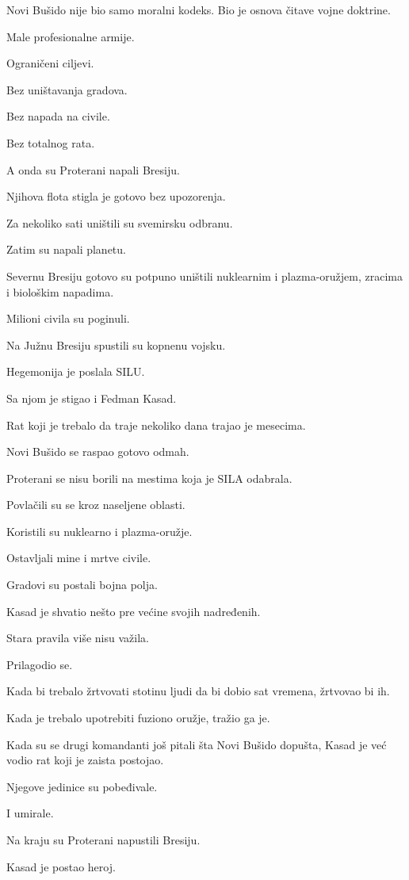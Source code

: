 Novi Bušido nije bio samo moralni kodeks. Bio je osnova čitave vojne doktrine.

Male profesionalne armije.

Ograničeni ciljevi.

Bez uništavanja gradova.

Bez napada na civile.

Bez totalnog rata.

A onda su Proterani napali Bresiju.

Njihova flota stigla je gotovo bez upozorenja.

Za nekoliko sati uništili su svemirsku odbranu.

Zatim su napali planetu.

Severnu Bresiju gotovo su potpuno uništili nuklearnim i plazma-oružjem, zracima i biološkim napadima.

Milioni civila su poginuli.

Na Južnu Bresiju spustili su kopnenu vojsku.

Hegemonija je poslala SILU.

Sa njom je stigao i Fedman Kasad.

Rat koji je trebalo da traje nekoliko dana trajao je mesecima.

Novi Bušido se raspao gotovo odmah.

Proterani se nisu borili na mestima koja je SILA odabrala.

Povlačili su se kroz naseljene oblasti.

Koristili su nuklearno i plazma-oružje.

Ostavljali mine i mrtve civile.

Gradovi su postali bojna polja.

Kasad je shvatio nešto pre većine svojih nadređenih.

Stara pravila više nisu važila.

Prilagodio se.

Kada bi trebalo žrtvovati stotinu ljudi da bi dobio sat vremena, žrtvovao bi ih.

Kada je trebalo upotrebiti fuziono oružje, tražio ga je.

Kada su se drugi komandanti još pitali šta Novi Bušido dopušta, Kasad je već vodio rat koji je zaista postojao.

Njegove jedinice su pobeđivale.

I umirale.

Na kraju su Proterani napustili Bresiju.

Kasad je postao heroj.

